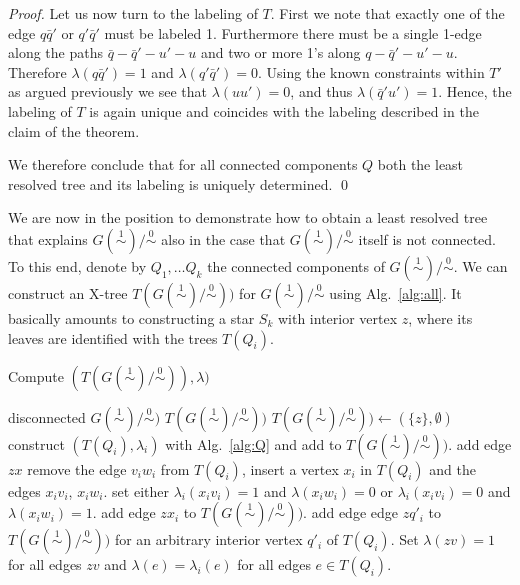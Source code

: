 \documentclass[smallextended]{svjour3}
\newcommand{\Ro}{\mathrel{\overset{0}{\sim}}}
\newcommand{\Rl}{\mathrel{\overset{1}{\sim}}}
\begin{document}
\begin{proof}
  Let us now turn to the labeling of $T$. First we note that exactly one of
  the edge $q\bar q'$ or $q'\bar q'$ must be labeled 1. Furthermore there
  must be a single 1-edge along the paths $\bar q-\bar q'-u' -u$ and two or
  more 1's along $q-\bar q'-u' -u$. Therefore $\lambda(q\bar q')=1$ and
  $\lambda(q'\bar q')=0$. Using the known constraints within $T'$ as argued
  previously we see that $\lambda(uu')=0$, and thus $\lambda(\bar
  q'u')=1$. Hence, the labeling of $T$ is again unique and coincides with
  the labeling described in the claim of the theorem.  

  We therefore conclude that for all connected components $Q$ both the
  least resolved tree and its labeling is uniquely determined.  \qed
\end{proof}

We are now in the position to demonstrate how to obtain a least resolved
tree that explains $G(\Rl)/\Ro$ also in the case that $G(\Rl)/\Ro$ itself
is not connected. To this end, denote by $Q_1,\dots Q_k$ the connected
components of $G(\Rl)/\Ro$. We can construct an X-tree $T(G(\Rl)/\Ro))$ for
$G(\Rl)/\Ro$ using Alg.\ \ref{alg:all}. It basically amounts to
constructing a star $S_k$ with interior vertex $z$, where its leaves are
identified with the trees $T(Q_i)$.

\begin{algorithm}
\caption{Compute $(T(G(\Rl)/\Ro)), \lambda)$}
\label{alg:all}
\begin{algorithmic}[1]
  \REQUIRE disconnected $G(\Rl)/\Ro)$
  \ENSURE $T(G(\Rl)/\Ro))$	
  \STATE $T(G(\Rl)/\Ro)) \gets (\{z\},\emptyset)$
     \STATE	construct $(T(Q_i), \lambda_i)$ with Alg.\ \ref{alg:Q}
		and add to $T(G(\Rl)/\Ro))$.
	\STATE add edge $zx$
        \STATE remove the edge
                $v_iw_i$ from $T(Q_i)$, insert a vertex $x_i$ in $T(Q_i)$
                and the edges $x_iv_i$, $x_iw_i$. 
        \STATE  set either $\lambda_{i}(x_iv_i)=1$ and $\lambda(x_iw_i)=0$
		or $\lambda_{i}(x_iv_i)=0$ and $\lambda(x_iw_i)=1$. 
                \label{step:edge}
	\STATE  add edge $zx_i$ to $T(G(\Rl)/\Ro))$.
     \ELSE \STATE \label{item:z}  	
                add edge edge $zq'_i$ to  $T(G(\Rl)/\Ro))$
		for an arbitrary interior vertex $q'_i$ of $T(Q_i)$. 
     \ENDIF		 
   \ENDFOR
   \STATE       Set $\lambda(zv)=1$ for all edges $zv$ and 
		$\lambda(e)=\lambda_i(e)$ for all edges $e\in T(Q_i)$.	
\end{algorithmic}
\end{algorithm}
\end{document}

